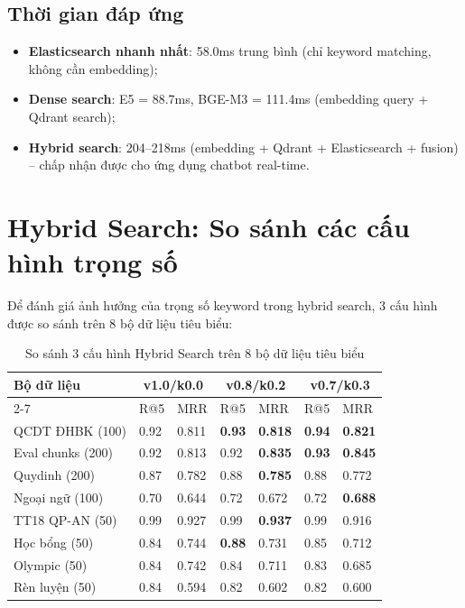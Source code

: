 \documentclass[../DoAn.tex]{subfiles}
\begin{document}
\subsection{Thời gian đáp ứng}
\begin{itemize}
    \item \textbf{Elasticsearch nhanh nhất}: 58.0ms trung bình (chỉ keyword matching, không cần embedding);
    \item \textbf{Dense search}: E5 = 88.7ms, BGE-M3 = 111.4ms (embedding query + Qdrant search);
    \item \textbf{Hybrid search}: 204--218ms (embedding + Qdrant + Elasticsearch + fusion) -- chấp nhận được cho ứng dụng chatbot real-time.
\end{itemize}

\section{Hybrid Search: So sánh các cấu hình trọng số}

Để đánh giá ảnh hưởng của trọng số keyword trong hybrid search, 3 cấu hình được so sánh trên 8 bộ dữ liệu tiêu biểu:

\begin{table}[H]
\centering
\begin{tabular}{|p{4cm}|l|l|l|l|l|l|}
\hline
\textbf{Bộ dữ liệu} & \multicolumn{2}{c|}{\textbf{v1.0/k0.0}} & \multicolumn{2}{c|}{\textbf{v0.8/k0.2}} & \multicolumn{2}{c|}{\textbf{v0.7/k0.3}} \\
\cline{2-7}
& R@5 & MRR & R@5 & MRR & R@5 & MRR \\
\hline
QCDT ĐHBK (100) & 0.92 & 0.811 & \textbf{0.93} & \textbf{0.818} & \textbf{0.94} & \textbf{0.821} \\
\hline
Eval chunks (200) & 0.92 & 0.813 & 0.92 & \textbf{0.835} & \textbf{0.93} & \textbf{0.845} \\
\hline
Quydinh (200) & 0.87 & 0.782 & 0.88 & \textbf{0.785} & 0.88 & 0.772 \\
\hline
Ngoại ngữ (100) & 0.70 & 0.644 & 0.72 & 0.672 & 0.72 & \textbf{0.688} \\
\hline
TT18 QP-AN (50) & 0.99 & 0.927 & 0.99 & \textbf{0.937} & 0.99 & 0.916 \\
\hline
Học bổng (50) & 0.84 & 0.744 & \textbf{0.88} & 0.731 & 0.85 & 0.712 \\
\hline
Olympic (50) & 0.84 & 0.742 & 0.84 & 0.711 & 0.83 & 0.685 \\
\hline
Rèn luyện (50) & 0.84 & 0.594 & 0.82 & 0.602 & 0.82 & 0.600 \\
\hline
\end{tabular}
\caption{So sánh 3 cấu hình Hybrid Search trên 8 bộ dữ liệu tiêu biểu}
\end{table}
\end{document}
